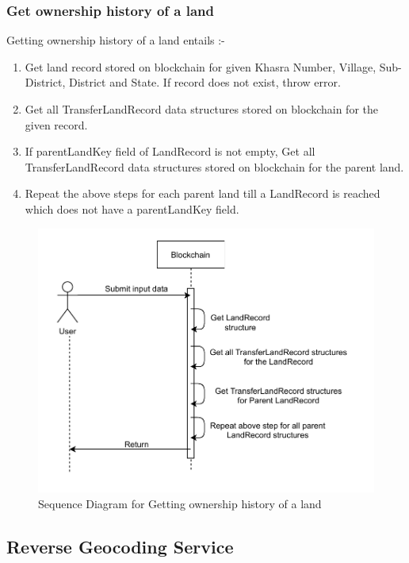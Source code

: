 \documentclass{article}
\begin{document}
    \subsubsection{Get ownership history of a land}
        Getting ownership history of a land entails :-
        \begin{enumerate}
            \item Get land record stored on blockchain for given Khasra Number, Village, Sub-District, District and State. If record does not exist, throw error.
            \item Get all TransferLandRecord data structures stored on blockchain for the given record.
            \item If parentLandKey field of LandRecord is not empty, Get all TransferLandRecord data structures stored on blockchain for the parent land.
            \item Repeat the above steps for each parent land till a LandRecord is reached which does not have a parentLandKey field. 
        \end{enumerate}

        \begin{figure}[htbp]
            \includegraphics[scale=0.25]{blockchain_seq_get_history}
            \centering
            \caption{Sequence Diagram for Getting ownership history of a land}
        \end{figure}
    
    \subsection{Reverse Geocoding Service}
\end{document}
